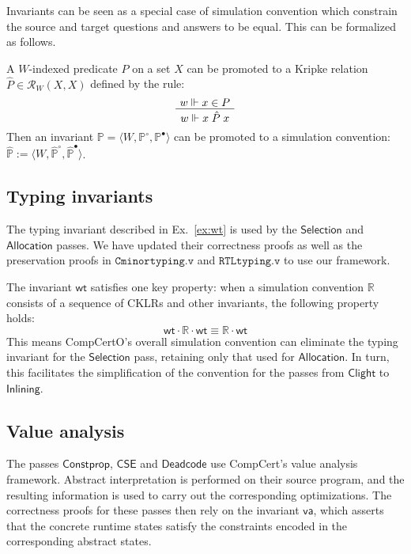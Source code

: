 \documentclass[sigplan,screen]{acmart}
\newcommand{\kw}[1]{\ensuremath{ \mathsf{#1} }}
\newcommand{\que}{\circ}
\newcommand{\ans}{\bullet}
\newenvironment{optional}{}{}
\begin{document}
\begin{optional}
Invariants can be seen as a special case of simulation convention
which constrain the source and target questions and answers
to be equal.
This can be formalized as follows.

\begin{definition}
A $W$-indexed predicate $P$ on a set $X$
can be promoted to a Kripke relation
$\hat{P} \in \mathcal{R}_W(X, X)$
defined by the rule:
\[
  \AxiomC{$w \Vdash x \in P$}
  \UnaryInfC{$w \Vdash x \mathrel{\hat{P}} x$}
  \DisplayProof
\]
Then an invariant
$\mathbb{P} = \langle W, \mathbb{P}^\que, \mathbb{P}^\ans \rangle$
can be promoted to a simulation convention:
$\hat{\mathbb{P}} :=
 \langle W, \hat{\mathbb{P}}^\que, \hat{\mathbb{P}}^\ans \rangle$.
\end{definition}


\subsection{Typing invariants} \label{sec:wt} %

The typing invariant described in Ex.~\ref{ex:wt}
is used by the $\kw{Selection}$ and $\kw{Allocation}$ passes.
We have updated their correctness proofs
as well as the preservation proofs in
$\texttt{Cminortyping.v}$ and $\texttt{RTLtyping.v}$
to use our framework.

The invariant $\kw{wt}$ satisfies one key property:
when a simulation convention $\mathbb{R}$
consists of a sequence of CKLRs and other invariants,
the following property holds:
\[
  \kw{wt} \cdot \mathbb{R} \cdot \kw{wt} \equiv
  \mathbb{R} \cdot \kw{wt}
\]
This means CompCertO's overall simulation convention
can eliminate the typing invariant for the $\kw{Selection}$ pass,
retaining only that used for $\kw{Allocation}$.
In turn, this facilitates the simplification of the convention for
the passes from \kw{Clight} to \kw{Inlining}.


\subsection{Value analysis} \label{sec:va} %

The passes
$\kw{Constprop}$, $\kw{CSE}$ and $\kw{Deadcode}$
use CompCert's value analysis framework.
Abstract interpretation is performed %
on their source program,
and the resulting information is used to carry out
the corresponding optimizations.
The correctness proofs for these passes then rely
on the invariant $\kw{va}$,
which asserts that the concrete runtime states
satisfy the constraints encoded in the corresponding
abstract states.


\end{optional}
\end{document}
